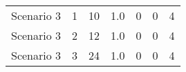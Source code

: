 {\begin{tabular}{lllllll}
	Scenario 3 & 1             & 10                 & 1.0          & 0                                                                          & 0					& 4                                                                                \\
	Scenario 3 & 2             & 12                 & 1.0          & 0                                                                          & 0					& 4                                                                                \\
	Scenario 3 & 3             & 24                 & 1.0          & 0                                                                          & 0					& 4                                                                                 \\
	\bottomrule
\end{tabular}

\vspace{1cm}


}

